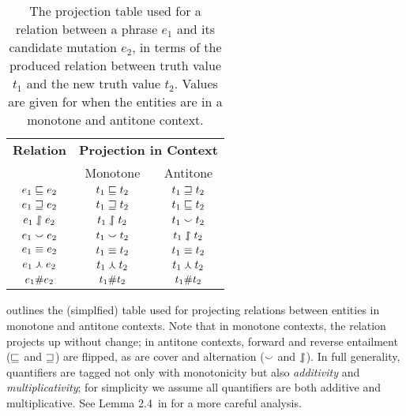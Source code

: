 \begin{table}
	\begin{center}
	\begin{tabular}{c|cc}
    \textbf{Relation} & \multicolumn{2}{|c}{\textbf{Projection in Context}} \\
             & Monotone & Antitone \\
    \hline
    $e_1 \sqsubseteq     e_2$ & $t_1 \sqsubseteq     t_2$ & $t_1 \sqsupseteq     t_2$ \\ 
    $e_1 \sqsupseteq     e_2$ & $t_1 \sqsupseteq     t_2$ & $t_1 \sqsubseteq     t_2$ \\ 
    $e_1 \downharpoonleft\hspace{-0.30em}\upharpoonright   e_2$ & $t_1 \downharpoonleft\hspace{-0.30em}\upharpoonright   t_2$ & $t_1 \smallsmile t_2$ \\ 
    $e_1 \smallsmile       e_2$ & $t_1 \smallsmile       t_2$ & $t_1 \downharpoonleft\hspace{-0.30em}\upharpoonright       t_2$ \\ 
    $e_1 \equiv  e_2$ & $t_1 \equiv  t_2$ & $t_1 \equiv  t_2$ \\ 
    $e_1 \curlywedge      e_2$ & $t_1 \curlywedge      t_2$ & $t_1 \curlywedge   t_2$ \\ 
    $e_1 \# e_2$ & $t_1 \# t_2$ & $t_1 \# t_2$
	\end{tabular}
	\caption{
    The projection table used for a relation between a phrase $e_1$ and
      its candidate mutation $e_2$, in terms of the produced relation
      between truth value $t_1$ and the new truth value $t_2$.
    Values are given for when the entities are in a monotone and
      antitone context.
		\label{tab:projectivity}
	}
	\end{center}
\end{table}

 outlines the (simplfied) table used for projecting
  relations between entities in monotone and antitone contexts.
Note that in monotone contexts, the relation projects up without
  change;
  in antitone contexts, forward and reverse entailment
  ($\sqsubseteq$ and $\sqsupseteq$) are flipped, as are cover and
  alternation ($\smallsmile$ and $\downharpoonleft\hspace{-0.30em}\upharpoonright$).
In full generality, quantifiers are tagged not only with monotonicity
  but also \textit{additivity} and \textit{multiplicativity};
  for simplicity we assume all quantifiers are both additive and
  multiplicative.
See Lemma 2.4\ in  for a more careful
  analysis.

